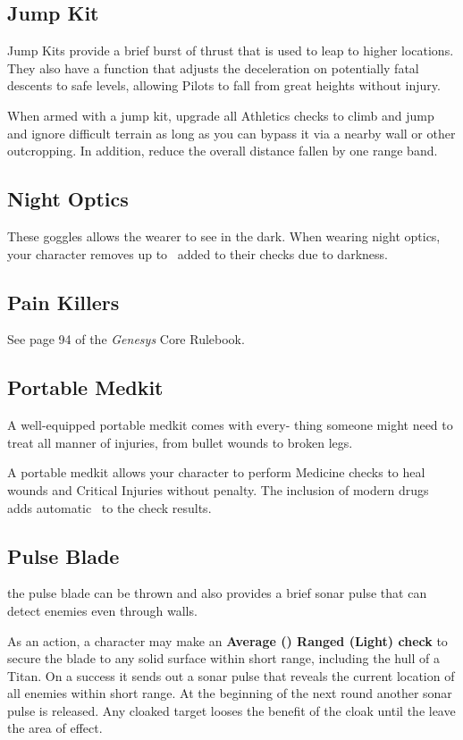 \documentclass[9pt, openany]{extbook}
\begin{document}
\subsection{Jump Kit}
Jump Kits provide a brief burst of thrust that is used to leap to higher locations. They also have a function that adjusts the deceleration on potentially fatal descents to safe levels, allowing Pilots to fall from great heights without injury.

When armed with a jump kit, upgrade all Athletics checks to climb and jump and ignore difficult terrain as long as you can bypass it via a nearby wall or other outcropping. In addition, reduce the overall distance fallen by one range band.

\subsection{Night Optics}
These goggles allows the wearer to see in the dark. When wearing night optics, your character
removes up to \SetbackDie\SetbackDie\ added to their checks due to darkness.


\subsection{Pain Killers}
See page 94 of the \emph{Genesys} Core Rulebook.


\subsection{Portable Medkit}
A well-equipped portable medkit comes with every- thing someone might need to treat all manner of injuries, from bullet wounds to broken legs.

A portable medkit allows your character to perform Medicine checks to heal wounds and Critical Injuries without penalty. The inclusion of modern drugs adds automatic \Advantage\ to the check results.

\subsection{Pulse Blade}
the pulse blade can be thrown and also provides a brief sonar pulse that can detect enemies even through walls.

As an action, a character may make an \textbf{Average (\DifficultyDie\DifficultyDie) Ranged (Light) check} to secure the blade to any solid surface within short range, including the hull of a Titan. On a success it sends out a sonar pulse that reveals the current location of all enemies within short range. At the beginning of the next round another sonar pulse is released. Any cloaked target looses the benefit of the cloak until the leave the area of effect.
\end{document}

